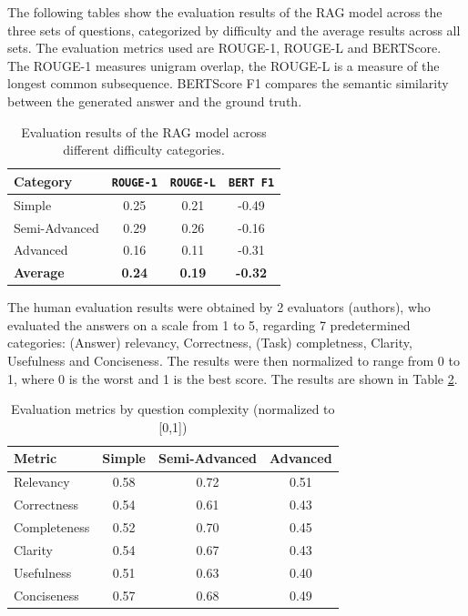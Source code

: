 \documentclass[fleqn,moreauthors,10pt]{ds_report}
\begin{document}
The following tables show the evaluation results of the RAG model across the three sets of questions, categorized by difficulty and the average results across all sets. The evaluation metrics used are ROUGE-1, ROUGE-L and BERTScore. The ROUGE-1 measures unigram overlap, the ROUGE-L is a measure of the longest common subsequence. BERTScore F1 compares the semantic similarity between the generated answer and the ground truth.

\begin{table}[h]
\centering
\caption{Evaluation results of the RAG model across different difficulty categories.}
\begin{tabular}{lccc}
\toprule
\textbf{Category} & \texttt{ROUGE-1} & \texttt{ROUGE-L} & \texttt{BERT F1} \\
\midrule
Simple         & 0.25 & 0.21 & -0.49 \\
Semi-Advanced  & 0.29 & 0.26 & -0.16 \\
Advanced       & 0.16 & 0.11 & -0.31 \\
\midrule
\textbf{Average} & \textbf{0.24} & \textbf{0.19} & \textbf{-0.32} \\
\bottomrule
\end{tabular}
\label{tab:rag_results}
\end{table}


The human evaluation results were obtained by 2 evaluators (authors), who evaluated the answers on a scale from 1 to 5, regarding 7 predetermined categories: (Answer) relevancy, Correctness, (Task) completness, Clarity, Usefulness and Conciseness. The results were then normalized to range from 0 to 1, where 0 is the worst and 1 is the best score. The results are shown in Table \ref{tab:metrics}.

\begin{table}[h]
\centering
\caption{Evaluation metrics by question complexity (normalized to [0,1])}
\small
\begin{tabular}{lccc}
\toprule
Metric & Simple & Semi-Advanced & Advanced \\
\midrule
Relevancy     & 0.58 & 0.72 & 0.51 \\
Correctness   & 0.54 & 0.61 & 0.43 \\
Completeness  & 0.52 & 0.70 & 0.45 \\
Clarity       & 0.54 & 0.67 & 0.43 \\
Usefulness    & 0.51 & 0.63 & 0.40 \\
Conciseness   & 0.57 & 0.68 & 0.49 \\
\bottomrule
\end{tabular}
\label{tab:metrics}
\end{table}
\end{document}
